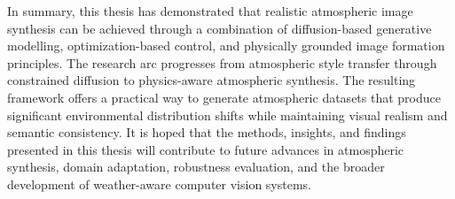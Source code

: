 \bigskip
\noindent In summary, this thesis has demonstrated that realistic atmospheric image synthesis can be achieved through a combination of diffusion-based generative modelling, optimization-based control, and physically grounded image formation principles. The research arc progresses from atmospheric style transfer through constrained diffusion to physics-aware atmospheric synthesis. The resulting framework offers a practical way to generate atmospheric datasets that produce significant environmental distribution shifts while maintaining visual realism and semantic consistency. It is hoped that the methods, insights, and findings presented in this thesis will contribute to future advances in atmospheric synthesis, domain adaptation, robustness evaluation, and the broader development of weather-aware computer vision systems.
